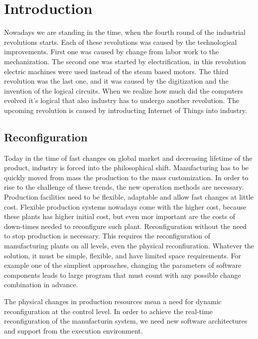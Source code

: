 
\chapter{Introduction} %

\label{Chapter1} %

Nowadays we are standing in the time, when the fourth round of the industrial revolutions starts. Each of these revolutions was caused by the technological improvements. First one was caused by change from labor work to the mechanization. The second one was started by electrification, in this revolution electric machines were used instead of the steam based motors. The third revolution was the last one, and it was caused by the digitization and the invention of the logical circuits. When we realize how much did the computers evolved it's logical that also industry has to undergo another revolution.
The upcoming revolution is caused by introducting Internet of Things into industry. \cite{brettel2014virtualization}

\section{Reconfiguration}

Today in the time of fast changes on global market and decreasing lifetime of the product, industry is forced into the philosophical shift. 
Manufacturing has to be quickly moved from mass the production to the mass customization. 
In order to rise to the challenge of these trends, the new operation methods are necessary. Production facilities need to be flexible, adaptable and allow fast changes at little cost.
Flexible production systems nowadays come with the higher cost, because these plants has higher initial cost, but even mor important are the costs of down-times needed to reconfigure such plant. 
Reconfiguration without the need to stop production is necessary. 
This requires the reconfiguration of manufacturing plants on all levels, even the physical reconfiuration. Whatever the solution, it must be simple, flexible, and have limited space requirements. For example one of the simpliest approaches, changing the parameters of software components leads to large program that must count with any possible change combination in advance. 

The physical changes in production resources mean a need for dynamic reconfiguration at the control level. 
In order to achieve the real-time reconfiguration of the manufacturin system, we need new software architectures and support from the execution environment. 

